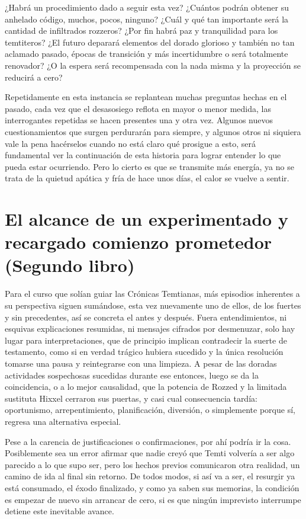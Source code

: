\documentclass[
]{book}
\begin{document}
¿Habrá un procedimiento dado a seguir esta vez? ¿Cuántos podrán obtener su anhelado código, muchos, pocos, ninguno? ¿Cuál y qué tan importante será la cantidad de infiltrados rozzeros? ¿Por fin habrá paz y tranquilidad para los temtiteros? ¿El futuro deparará elementos del dorado glorioso y también no tan aclamado pasado, épocas de transición y más incertidumbre o será totalmente renovador? ¿O la espera será recompensada con la nada misma y la proyección se reducirá a cero?

Repetidamente en esta instancia se replantean muchas preguntas hechas en el pasado, cada vez que el desasosiego reflota en mayor o menor medida, las interrogantes repetidas se hacen presentes una y otra vez. Algunos nuevos cuestionamientos que surgen perdurarán para siempre, y algunos otros ni siquiera vale la pena hacérselos cuando no está claro qué prosigue a esto, será fundamental ver la continuación de esta historia para lograr entender lo que pueda estar ocurriendo. Pero lo cierto es que se transmite más energía, ya no se trata de la quietud apática y fría de hace unos días, el calor se vuelve a sentir.

\hypertarget{el-alcance-de-un-experimentado-y-recargado-comienzo-prometedor-segundo-libro}{%
\chapter{El alcance de un experimentado y recargado comienzo prometedor (Segundo libro)}\label{el-alcance-de-un-experimentado-y-recargado-comienzo-prometedor-segundo-libro}}

Para el curso que solían guiar las Crónicas Temtianas, más episodios inherentes a su perspectiva siguen sumándose, esta vez nuevamente uno de ellos, de los fuertes y sin precedentes, así se concreta el antes y después. Fuera entendimientos, ni esquivas explicaciones resumidas, ni mensajes cifrados por desmenuzar, solo hay lugar para interpretaciones, que de principio implican contradecir la suerte de testamento, como si en verdad trágico hubiera sucedido y la única resolución tomarse una pausa y reintegrarse con una limpieza. A pesar de las doradas actividades sospechosas sucedidas durante ese entonces, luego se da la coincidencia, o a lo mejor causalidad, que la potencia de Rozzed y la limitada sustituta Hixxel cerraron sus puertas, y casi cual consecuencia tardía: oportunismo, arrepentimiento, planificación, diversión, o simplemente porque sí, regresa una alternativa especial.

Pese a la carencia de justificaciones o confirmaciones, por ahí podría ir la cosa. Posiblemente sea un error afirmar que nadie creyó que Temti volvería a ser algo parecido a lo que supo ser, pero los hechos previos comunicaron otra realidad, un camino de ida al final sin retorno. De todos modos, si así va a ser, el resurgir ya está consumado, el éxodo finalizado, y como ya saben sus memorias, la condición es empezar de nuevo sin arrancar de cero, si es que ningún imprevisto interrumpe detiene este inevitable avance.
\end{document}
